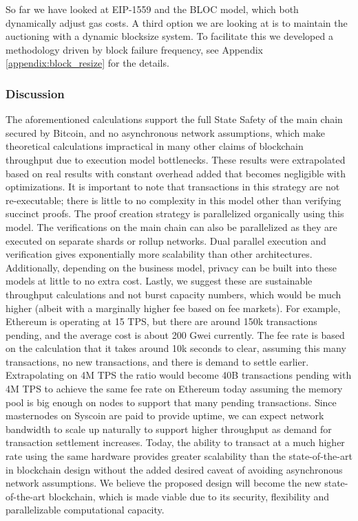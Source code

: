 \documentclass[peerreview]{ieeesyscoin}
\begin{document}
So far we have looked at EIP-1559 and the BLOC model, which both dynamically adjust gas costs. A third option we are looking at is to maintain the auctioning with a dynamic blocksize system. To facilitate this we developed a methodology driven by block failure frequency, see Appendix \ref{appendix:block_resize} for the details. 

\subsubsection{Discussion}

The aforementioned calculations support the full State Safety of the main chain secured by Bitcoin, and no asynchronous network assumptions, which make theoretical calculations impractical in many other claims of blockchain throughput due to execution model bottlenecks. These results were extrapolated based on real results with constant overhead added that becomes negligible with optimizations. It is important to  note that transactions in this strategy are not re-executable; there is little to no complexity in this model other than verifying succinct proofs. The proof creation strategy is parallelized organically using this model. The verifications on the main chain can also be parallelized as they are executed on separate shards or rollup networks. Dual parallel execution and verification gives exponentially more scalability than other architectures. Additionally, depending on the business model, privacy can be built into these models at little to no extra cost. Lastly, we suggest  these are sustainable throughput calculations and not burst capacity numbers, which would be much higher (albeit with a marginally higher fee based on fee markets). For example, Ethereum is operating at 15 TPS, but there are around 150k transactions pending, and the average cost is about 200 Gwei currently. The fee rate is based on the calculation that it  takes around 10k seconds to clear, assuming this many transactions, no new transactions, and there is demand to settle earlier. Extrapolating on 4M TPS the ratio would become 40B transactions pending with 4M TPS to achieve the same fee rate on Ethereum today assuming the memory pool is big enough on nodes to support that many pending transactions. Since masternodes on Syscoin are paid to provide uptime, we can expect network bandwidth to scale up naturally to support higher throughput as demand for transaction settlement increases. Today, the ability to transact at a much higher rate using the same hardware provides greater scalability than the state-of-the-art in blockchain design without the added desired caveat of avoiding asynchronous network assumptions. We believe the proposed design will become the new state-of-the-art blockchain, which is made viable due to its security, flexibility and parallelizable computational capacity.
\end{document}

